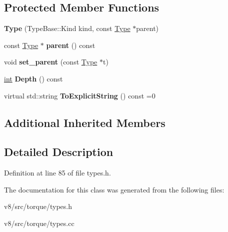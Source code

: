 \subsection*{Protected Member Functions}
\begin{DoxyCompactItemize}
\item 
\mbox{\label{classv8_1_1internal_1_1torque_1_1Type_a898effdba121d48753ebe7f1dbdb4941}} 
{\bfseries Type} (Type\+Base\+::\+Kind kind, const \mbox{\hyperlink{classv8_1_1internal_1_1torque_1_1Type}{Type}} $\ast$parent)
\item 
\mbox{\label{classv8_1_1internal_1_1torque_1_1Type_adb3335158f976af682ea0c5bdb2611fa}} 
const \mbox{\hyperlink{classv8_1_1internal_1_1torque_1_1Type}{Type}} $\ast$ {\bfseries parent} () const
\item 
\mbox{\label{classv8_1_1internal_1_1torque_1_1Type_ad1f54cb5ed3efd87950bf07a0d0bfa77}} 
void {\bfseries set\+\_\+parent} (const \mbox{\hyperlink{classv8_1_1internal_1_1torque_1_1Type}{Type}} $\ast$t)
\item 
\mbox{\label{classv8_1_1internal_1_1torque_1_1Type_a0f6752b1336cbd88609a803600943ee3}} 
\mbox{\hyperlink{classint}{int}} {\bfseries Depth} () const
\item 
\mbox{\label{classv8_1_1internal_1_1torque_1_1Type_a6172ed269fb4b1f6fd88c26b0c09845d}} 
virtual std\+::string {\bfseries To\+Explicit\+String} () const =0
\end{DoxyCompactItemize}
\subsection*{Additional Inherited Members}


\subsection{Detailed Description}


Definition at line 85 of file types.\+h.



The documentation for this class was generated from the following files\+:\begin{DoxyCompactItemize}
\item 
v8/src/torque/types.\+h\item 
v8/src/torque/types.\+cc\end{DoxyCompactItemize}
